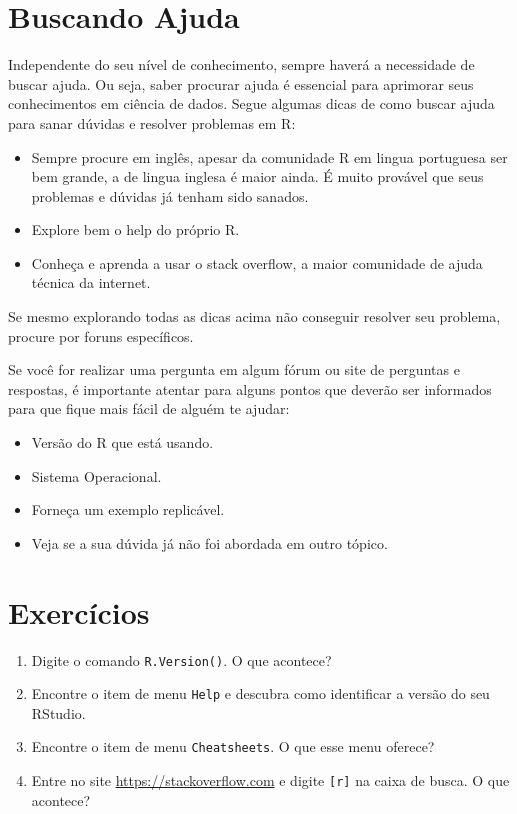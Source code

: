 \documentclass[]{book}
\providecommand{\tightlist}{%
  \setlength{\itemsep}{0pt}\setlength{\parskip}{0pt}}
\begin{document}
\section{Buscando Ajuda}\label{buscando-ajuda}

Independente do seu nível de conhecimento, sempre haverá a necessidade
de buscar ajuda. Ou seja, saber procurar ajuda é essencial para
aprimorar seus conhecimentos em ciência de dados. Segue algumas dicas de
como buscar ajuda para sanar dúvidas e resolver problemas em R:

\begin{itemize}
\tightlist
\item
  Sempre procure em inglês, apesar da comunidade R em lingua portuguesa
  ser bem grande, a de lingua inglesa é maior ainda. É muito provável
  que seus problemas e dúvidas já tenham sido sanados.
\item
  Explore bem o help do próprio R.
\item
  Conheça e aprenda a usar o stack overflow, a maior comunidade de ajuda
  técnica da internet.
\end{itemize}

Se mesmo explorando todas as dicas acima não conseguir resolver seu
problema, procure por foruns específicos.

Se você for realizar uma pergunta em algum fórum ou site de perguntas e
respostas, é importante atentar para alguns pontos que deverão ser
informados para que fique mais fácil de alguém te ajudar:

\begin{itemize}
\tightlist
\item
  Versão do R que está usando.
\item
  Sistema Operacional.
\item
  Forneça um exemplo replicável.
\item
  Veja se a sua dúvida já não foi abordada em outro tópico.
\end{itemize}

\section{Exercícios}\label{exercicios}

\begin{enumerate}
\def\labelenumi{\arabic{enumi}.}
\item
  Digite o comando \texttt{R.Version()}. O que acontece?
\item
  Encontre o item de menu \texttt{Help} e descubra como identificar a
  versão do seu RStudio.
\item
  Encontre o item de menu \texttt{Cheatsheets}. O que esse menu oferece?
\item
  Entre no site \url{https://stackoverflow.com} e digite
  \texttt{{[}r{]}} na caixa de busca. O que acontece?
\end{enumerate}
\end{document}

